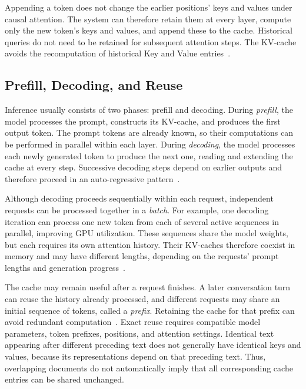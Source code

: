 Appending a token does not change the earlier positions' keys and values under causal attention. The system can therefore retain them at every layer, compute only the new token's keys and values, and append these to the cache. Historical queries do not need to be retained for subsequent attention steps. The KV-cache avoids the recomputation of historical Key and Value entries~\cite{kv_kwon2023pagedattention}.

\subsection{Prefill, Decoding, and Reuse}

Inference usually consists of two phases: prefill and decoding. During \emph{prefill}, the model processes the prompt, constructs its KV-cache, and produces the first output token. The prompt tokens are already known, so their computations can be performed in parallel within each layer. During \emph{decoding}, the model processes each newly generated token to produce the next one, reading and extending the cache at every step. Successive decoding steps depend on earlier outputs and therefore proceed in an auto-regressive pattern~\cite{kv_zhong2024distserve}.

Although decoding proceeds sequentially within each request, independent requests can be processed together in a \emph{batch}. For example, one decoding iteration can process one new token from each of several active sequences in parallel, improving GPU utilization. These sequences share the model weights, but each requires its own attention history. Their KV-caches therefore coexist in memory and may have different lengths, depending on the requests' prompt lengths and generation progress~\cite{kv_kwon2023pagedattention}.

The cache may remain useful after a request finishes. A later conversation turn can reuse the history already processed, and different requests may share an initial sequence of tokens, called a \emph{prefix}. Retaining the cache for that prefix can avoid redundant computation~\cite{kv_zheng2024sglang}. Exact reuse requires compatible model parameters, token prefixes, positions, and attention settings. Identical text appearing after different preceding text does not generally have identical keys and values, because its representations depend on that preceding text. Thus, overlapping documents do not automatically imply that all corresponding cache entries can be shared unchanged.


